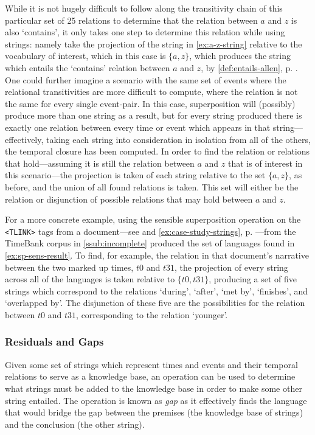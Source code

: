 \documentclass[a4paper,12pt,leqno,twoside]{article}
\newcommand{\vph}[1]{\vphantom{#1}}
\newcommand{\ebox}[1]{\fbox{$\vph{'(),}#1$}}
\newcommand{\EventString}[1]{%
	\renewcommand*{\do}[1]{\ebox{##1}}%
	\PipeParser{#1}%
}
\begin{document}
While it is not hugely difficult to follow along the transitivity chain of this particular set of 25 relations to determine that the relation between $a$ and $z$ is also `contains', it only takes one step to determine this relation while using strings: namely take the projection of the string in \cref{ex:a-z-string} relative to the vocabulary of interest, which in this case is $\{a,z\}$, which produces the string \EventString{{}|a|a,z|a|{}} which entails the `contains' relation between $a$ and $z$, by \cref{def:entails-allen}, p. \pageref{def:entails-allen}. One could further imagine a scenario with the same set of events where the relational transitivities are more difficult to compute, where the relation is not the same for every single event-pair. In this case, superposition will (possibly) produce more than one string as a result, but for every string produced there is exactly one relation between every time or event which appears in that string---effectively, taking each string into consideration in isolation from all of the others, the temporal closure has been computed. In order to find the relation or relations that hold---assuming it is still the relation between $a$ and $z$ that is of interest in this scenario---the projection is taken of each string relative to the set $\{a,z\}$, as before, and the union of all found relations is taken. This set will either be the relation or disjunction of possible relations that may hold between $a$ and $z$.

For a more concrete example, using the sensible superposition operation on the \allowbreak{}\verb|<TLINK>| tags from a document---see  and \cref{ex:case-study-strings}, p. \pageref{ex:case-study-strings}---from the TimeBank corpus in \cref{ssub:incomplete} produced the set of languages found in \cref{ex:sp-sens-result}. To find, for example, the relation in that document's narrative between the two marked up times, $t0$ and $t31$, the projection of every string across all of the languages is taken relative to $\{t0, t31\}$, producing a set of five strings which correspond to the relations `during', `after', `met by', `finishes', and `overlapped by'. The disjunction of these five are the possibilities for the relation between $t0$ and $t31$, corresponding to the \citet{Freksa1992} relation `younger'.

\subsubsection{Residuals and Gaps}\label{ssub:residuals}
Given some set of strings which represent times and events and their temporal relations to serve as a knowledge base, an operation can be used to determine what strings must be added to the knowledge base in order to make some other string entailed. The operation is known as \textit{gap} as it effectively finds the language that would bridge the gap between the premises (the knowledge base of strings) and the conclusion (the other string).
\end{document}
